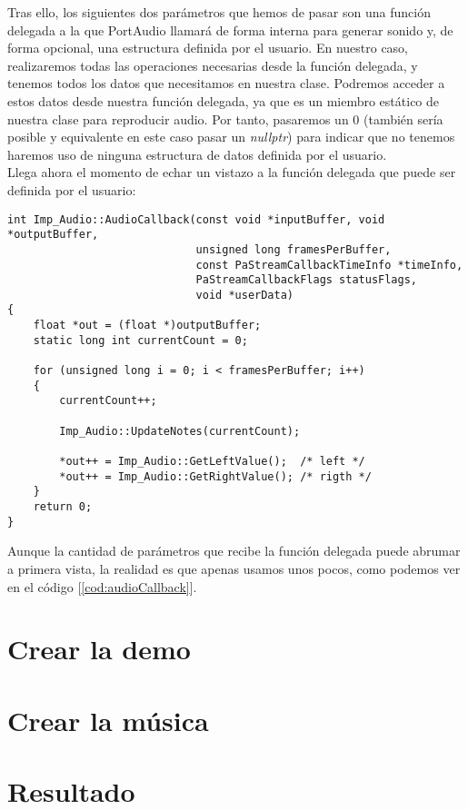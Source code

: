 Tras ello, los siguientes dos parámetros que hemos de pasar son una función delegada a la que PortAudio llamará de forma interna para generar sonido y, de forma opcional, una estructura definida por el usuario. En nuestro caso, realizaremos todas las operaciones necesarias desde la función delegada, y tenemos todos los datos que necesitamos en nuestra clase. Podremos acceder a estos datos desde nuestra función delegada, ya que es un miembro estático de nuestra clase para reproducir audio. Por tanto, pasaremos un 0 (también sería posible y equivalente en este caso pasar un \emph{nullptr}) para indicar que no tenemos haremos uso de ninguna estructura de datos definida por el usuario.\\

Llega ahora el momento de echar un vistazo a la función delegada que puede ser definida por el usuario:\\

\begin{lstlisting}[style=C-color, caption={Función delegada que pasamos a PortAudio},label=cod:audioCallback]
int Imp_Audio::AudioCallback(const void *inputBuffer, void *outputBuffer,
                             unsigned long framesPerBuffer,
                             const PaStreamCallbackTimeInfo *timeInfo,
                             PaStreamCallbackFlags statusFlags,
                             void *userData)
{
    float *out = (float *)outputBuffer;
    static long int currentCount = 0;

    for (unsigned long i = 0; i < framesPerBuffer; i++)
    {
        currentCount++;

        Imp_Audio::UpdateNotes(currentCount);

        *out++ = Imp_Audio::GetLeftValue();  /* left */
        *out++ = Imp_Audio::GetRightValue(); /* rigth */
    }
    return 0;
}
\end{lstlisting}

Aunque la cantidad de parámetros que recibe la función delegada puede abrumar a primera vista, la realidad es que apenas usamos unos pocos, como podemos ver en el código [\ref{cod:audioCallback}].


\section{Crear la demo}

\section{Crear la música}

\section{Resultado}
